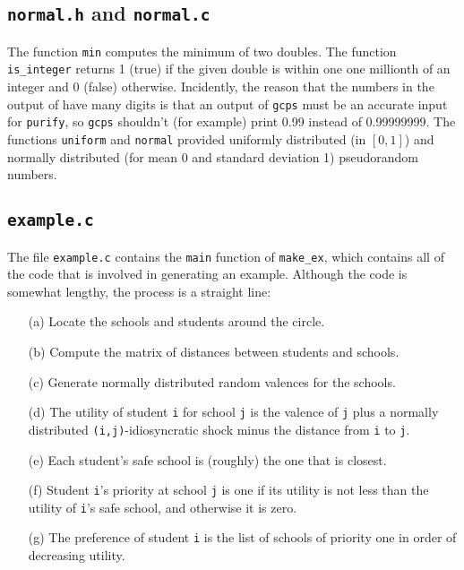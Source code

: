 \documentclass[12pt]{article}
\theoremstyle{definition}
\begin{document}
\begin{appendix}
\subsection{\texttt{normal.h} and \texttt{normal.c}}

The function \texttt{min} computes the minimum of two doubles.  The
function \texttt{is\_integer} returns 1 (true) if the given double is
within one one millionth of an integer and 0 (false) otherwise.
Incidently, the reason that the numbers in the output of 
have many digits is that an output of \texttt{gcps} must be an
accurate input for \texttt{purify}, so \texttt{gcps} shouldn't (for
example) print 0.99 instead of 0.99999999. The functions
\texttt{uniform} and \texttt{normal} provided uniformly distributed
(in $[0,1]$) and normally distributed (for mean 0 and standard
deviation 1) pseudorandom numbers.

\subsection{\texttt{example.c}}

The file \texttt{example.c} contains the \texttt{main} function of
\texttt{make\_ex}, which contains all of the code that is involved in
generating an example.  Although the code is somewhat lengthy, the
process is a straight line:
\begin{enumerate}
  \item[(a)] Locate the schools and students around the circle.
  \item[(b)] Compute the matrix of distances between students and schools.
  \item[(c)] Generate normally distributed random valences for the schools.
  \item[(d)] The utility of student \texttt{i} for school \texttt{j}
    is the valence of \texttt{j} plus a normally distributed
    \texttt{(i,j)}-idiosyncratic shock minus the distance from
    \texttt{i} to \texttt{j}.
  \item[(e)] Each student's safe school is (roughly) the one that is closest.
  \item[(f)] Student \texttt{i}'s priority at school \texttt{j} is one
    if its utility is not less than the utility of \texttt{i}'s safe
    school, and otherwise it is zero.
  \item[(g)] The preference of student \texttt{i} is the list of
    schools of priority one in order of decreasing utility.
\end{enumerate}


\end{appendix}
\end{document}
